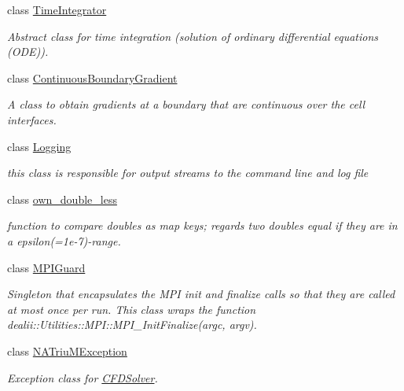 \begin{DoxyCompactItemize}
class \hyperlink{classnatrium_1_1TimeIntegrator}{TimeIntegrator}
\begin{DoxyCompactList}\small\item\em Abstract class for time integration (solution of ordinary differential equations (ODE)). \item\end{DoxyCompactList}\item 
class \hyperlink{classnatrium_1_1ContinuousBoundaryGradient}{ContinuousBoundaryGradient}
\begin{DoxyCompactList}\small\item\em A class to obtain gradients at a boundary that are continuous over the cell interfaces. \item\end{DoxyCompactList}\item 
class \hyperlink{classnatrium_1_1Logging}{Logging}
\begin{DoxyCompactList}\small\item\em this class is responsible for output streams to the command line and log file \item\end{DoxyCompactList}\item 
class \hyperlink{classnatrium_1_1own__double__less}{own\_\-double\_\-less}
\begin{DoxyCompactList}\small\item\em function to compare doubles as map keys; regards two doubles equal if they are in a epsilon(=1e-\/7)-\/range. \item\end{DoxyCompactList}\item 
class \hyperlink{classnatrium_1_1MPIGuard}{MPIGuard}
\begin{DoxyCompactList}\small\item\em Singleton that encapsulates the MPI init and finalize calls so that they are called at most once per run. This class wraps the function dealii::Utilities::MPI::MPI\_\-InitFinalize(argc, argv). \item\end{DoxyCompactList}\item 
class \hyperlink{classnatrium_1_1NATriuMException}{NATriuMException}
\begin{DoxyCompactList}\small\item\em Exception class for \hyperlink{classnatrium_1_1CFDSolver}{CFDSolver}. \item\end{DoxyCompactList}\item 

\end{DoxyCompactItemize}
